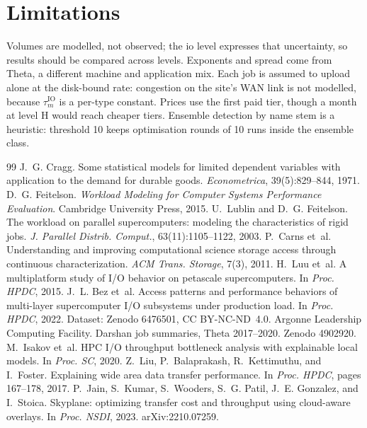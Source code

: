 \documentclass[11pt,a4paper]{article}
\newcommand{\tauIO}{\tau^{\mathrm{IO}}}
\begin{document}
\section{Limitations}\label{sec:limits}
Volumes are modelled, not observed; the io level expresses that uncertainty, so
results should be compared across levels. Exponents and spread come from Theta, a
different machine and application mix. Each job is assumed to upload alone at the
disk-bound rate: congestion on the site's WAN link is not modelled, because
$\tauIO_m$ is a per-type constant. Prices use the first paid tier, though a month
at level H would reach cheaper tiers. Ensemble detection by name stem is a
heuristic: threshold 10 keeps optimisation rounds of 10 runs inside the ensemble
class.

\begin{thebibliography}{99}\small
{} J.~G. Cragg. Some statistical models for limited dependent variables with application to the demand for durable goods. \emph{Econometrica}, 39(5):829--844, 1971.
 D.~G. Feitelson. \emph{Workload Modeling for Computer Systems Performance Evaluation}. Cambridge University Press, 2015.
 U.~Lublin and D.~G. Feitelson. The workload on parallel supercomputers: modeling the characteristics of rigid jobs. \emph{J. Parallel Distrib. Comput.}, 63(11):1105--1122, 2003.
 P.~Carns et~al. Understanding and improving computational science storage access through continuous characterization. \emph{ACM Trans. Storage}, 7(3), 2011.
 H.~Luu et~al. A multiplatform study of I/O behavior on petascale supercomputers. In \emph{Proc. HPDC}, 2015.
 J.~L. Bez et~al. Access patterns and performance behaviors of multi-layer supercomputer I/O subsystems under production load. In \emph{Proc. HPDC}, 2022. Dataset: Zenodo 6476501, CC BY-NC-ND~4.0.
 Argonne Leadership Computing Facility. Darshan job summaries, Theta 2017--2020. Zenodo 4902920.
 M.~Isakov et~al. HPC I/O throughput bottleneck analysis with explainable local models. In \emph{Proc. SC}, 2020.
 Z.~Liu, P.~Balaprakash, R.~Kettimuthu, and I.~Foster. Explaining wide area data transfer performance. In \emph{Proc. HPDC}, pages 167--178, 2017.
 P.~Jain, S.~Kumar, S.~Wooders, S.~G. Patil, J.~E. Gonzalez, and I.~Stoica. Skyplane: optimizing transfer cost and throughput using cloud-aware overlays. In \emph{Proc. NSDI}, 2023. arXiv:2210.07259.

\end{thebibliography}
\end{document}
